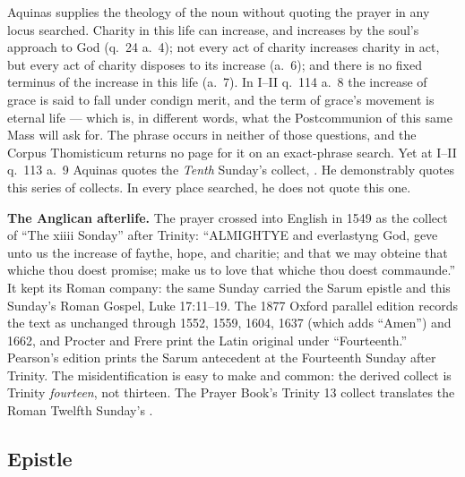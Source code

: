 \begin{witnessnote}
Aquinas supplies the theology of the noun without quoting the prayer in any
locus searched. Charity in this life can increase, and increases
by the soul's approach to God (q.~24 a.~4); not every act of charity increases
charity in act, but every act of charity disposes to its increase (a.~6);
and there is no fixed terminus of the increase in this life (a.~7). In I--II
q.~114 a.~8 the increase of grace is said to fall under condign merit, and the
term of grace's movement is eternal life --- which is, in different words, what
the Postcommunion of this same Mass will ask for. The phrase  occurs in neither of those questions, and the Corpus
Thomisticum returns no page for it on an exact-phrase search. Yet at
I--II q.~113 a.~9 Aquinas quotes the \textit{Tenth} Sunday's collect,
.
He demonstrably quotes this series of collects. In every place searched, he
does not quote this one.
\end{witnessnote}

\textbf{The Anglican afterlife.} The prayer crossed
into English in 1549 as the collect of ``The xiiii Sonday'' after Trinity:
``ALMIGHTYE and everlastyng God, geve unto us the increase of faythe, hope, and
charitie; and that we may obteine that whiche thou doest promise; make us to
love that whiche thou doest commaunde.'' It kept its Roman company: the same
Sunday carried the Sarum epistle and this Sunday's Roman Gospel, Luke
17:11--19. The 1877 Oxford parallel edition records the text as unchanged
through 1552, 1559, 1604, 1637 (which adds ``Amen'') and 1662, and Procter and
Frere print the Latin original under ``Fourteenth.'' Pearson's edition prints
the Sarum antecedent at the Fourteenth Sunday after Trinity. The
misidentification is easy to make and common: the derived collect is Trinity
\textit{fourteen}, not thirteen. The
Prayer Book's Trinity 13 collect translates the Roman Twelfth Sunday's
.

\elementguard
\subsection*{Epistle }


